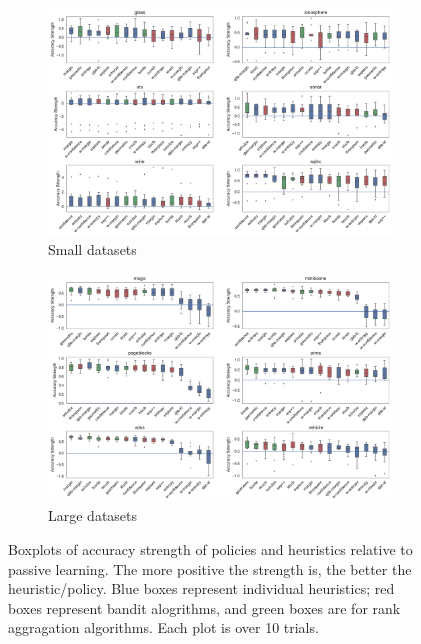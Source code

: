 \documentclass[fleqn,10pt,lineno]{wlpeerj} %
\begin{document}
\begin{figure}[tbp]
	\centering
	\begin{subfigure}[t]{\textwidth}
        \centering
        \includegraphics[width=\textwidth]{figures/strengths-accuracy-small}
        \caption{Small datasets}
	\end{subfigure}
	\begin{subfigure}[t]{\textwidth}
        \centering
        \includegraphics[width=\textwidth]{figures/strengths-accuracy-large}
        \caption{Large datasets}
    \end{subfigure}
	\caption[Policy strength]{Boxplots of accuracy strength of policies and
	heuristics relative to passive learning. The more positive the strength is,
	the better the heuristic/policy. Blue boxes represent individual
	heuristics; red boxes represent bandit alogrithms, and green boxes are for
	rank aggragation algorithms. Each plot is over 10 trials.}
	\label{fig:strengths-accuracy}
\end{figure}
\end{document}
